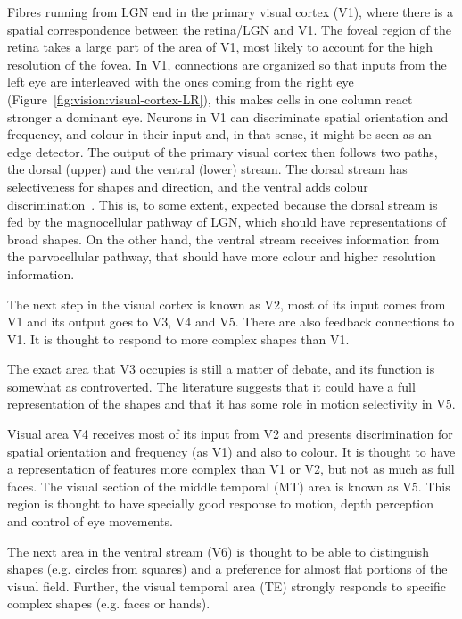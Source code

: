 Fibres running from LGN end in the primary visual cortex (V1), where there is a spatial correspondence between the retina/LGN and V1. The foveal region of the retina takes a large part of the area of V1, most likely to account for the high resolution of the fovea. In V1, connections are organized so that inputs from the left eye are interleaved with the ones coming from the right eye (Figure~\ref{fig:vision:visual-cortex-LR}), this makes cells in one column react stronger a dominant eye. Neurons in V1 can discriminate spatial orientation and frequency, and colour in their input and, in that sense, it might be seen as an edge detector. The output of the primary visual cortex then follows two paths, the dorsal (upper) and the ventral (lower) stream. The dorsal stream has selectiveness for shapes and direction, and the ventral adds colour discrimination~\cite{thompson2000brain}. This is, to some extent, expected because the dorsal stream is fed by the magnocellular pathway of LGN, which should have representations of broad shapes. On the other hand, the ventral stream receives information from the parvocellular pathway, that should have more colour and higher resolution information\cite{webvision}.

The next step in the visual cortex is known as V2, most of its input comes from V1 and its output goes to V3, V4 and V5. There are also feedback connections to V1. It is thought to respond to more complex shapes than V1. 

The exact area that V3 occupies is still a matter of debate, and its function is somewhat as controverted. The literature suggests that it could have a full representation of the shapes and that it has some role in motion selectivity in V5. 

Visual area V4 receives most of its input from V2 and presents 
discrimination for spatial orientation and frequency (as V1) and also to colour. It is thought to have a representation of features more complex than V1 or V2, but not as much as full faces. The visual section of the middle temporal (MT) area is known as V5. This region is thought to have specially good response to motion, depth perception and control of eye movements. 

The next area in the ventral stream (V6) is thought to be able to distinguish shapes (e.g. circles from squares) and a preference for almost flat portions of the visual field. Further, the visual temporal area (TE) strongly responds to specific complex shapes (e.g. faces or  hands)\cite{eye-brain-vision-hubel1995,thompson2000brain}.
